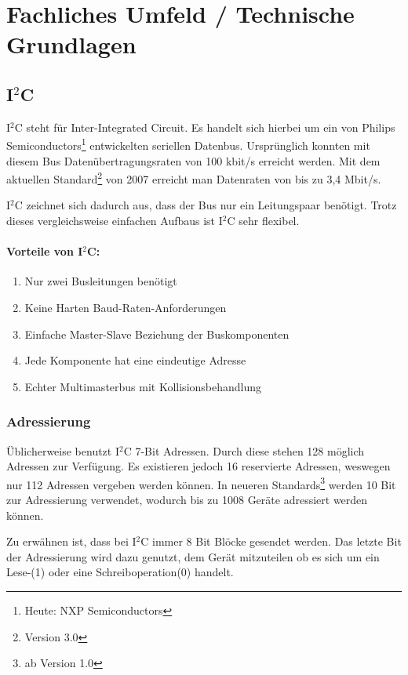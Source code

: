 \chapter{Fachliches Umfeld / Technische Grundlagen}
	\section{I$^{2}$C}
		I$^{2}$C steht für Inter-Integrated Circuit. Es handelt sich hierbei um ein von Philips Semiconductors\footnote{Heute: NXP Semiconductors} entwickelten seriellen Datenbus. Ursprünglich konnten mit diesem Bus Datenübertragungsraten von 100 kbit/s erreicht werden. Mit dem aktuellen Standard\footnote{Version 3.0} von 2007 erreicht man Datenraten von bis zu 3,4 Mbit/s. 
		
		I$^{2}$C zeichnet sich dadurch aus, dass der Bus nur ein Leitungspaar benötigt. Trotz dieses vergleichsweise einfachen Aufbaus ist I$^{2}$C sehr flexibel.
		\subsubsection{Vorteile von I$^{2}$C:}
			\begin{enumerate}
				\item Nur zwei Busleitungen benötigt
				\item Keine Harten Baud-Raten-Anforderungen
				\item Einfache Master-Slave Beziehung der Buskomponenten
				\item Jede Komponente hat eine eindeutige Adresse
				\item Echter Multimasterbus mit Kollisionsbehandlung
			\end{enumerate}
			
			\cite{I2C}
		\subsection{Adressierung}
			Üblicherweise benutzt I$^{2}$C 7-Bit Adressen. Durch diese stehen 128 möglich Adressen zur Verfügung. Es existieren jedoch 16 reservierte Adressen, weswegen nur 112 Adressen vergeben werden können. In neueren Standards\footnote{ab Version 1.0} werden 10 Bit zur Adressierung verwendet, wodurch bis zu 1008 Geräte adressiert werden können.
			
			Zu erwähnen ist, dass bei I$^{2}$C immer 8 Bit Blöcke gesendet werden. Das letzte Bit der Adressierung wird dazu genutzt, dem Gerät mitzuteilen ob es sich um ein Lese-(1) oder eine Schreiboperation(0) handelt.
			

